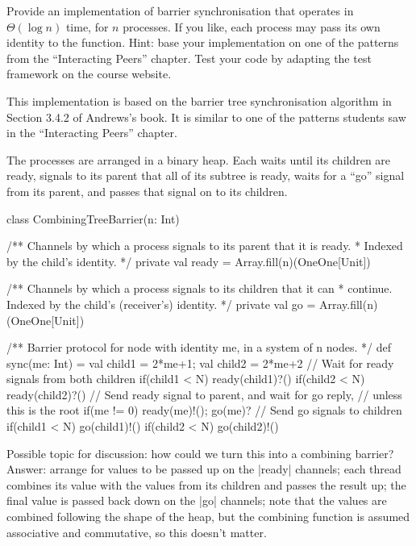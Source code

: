 \begin{question}
\label{Q:barrierLog}
Provide an implementation of barrier synchronisation that operates in
$\Theta(\log n)$ time, for $n$ processes.  If you like, each process may pass
its own identity to the  function.  Hint: base your implementation
on one of the patterns from the ``Interacting Peers'' chapter.  Test your code
by adapting the test framework on the course website. 
\end{question}


\begin{answer}
This implementation is based on the barrier tree synchronisation algorithm in
Section 3.4.2 of Andrews's book.  It is similar to one of the patterns
students saw in the ``Interacting Peers'' chapter.

The processes are arranged in a binary heap.  Each waits until its children
are ready, signals to its parent that all of its subtree is ready, waits for a
``go'' signal from its parent, and passes that signal on to its children.
%
\begin{scala}
class CombiningTreeBarrier(n: Int){
  /** Channels by which a process signals to its parent that it is ready.
    * Indexed by the child's identity. */ 
  private val ready = Array.fill(n)(OneOne[Unit])

  /** Channels by which a process signals to its children that it can
    * continue.  Indexed by the child's (receiver's) identity. */ 
  private val go = Array.fill(n)(OneOne[Unit])

  /** Barrier protocol for node with identity me, in a system of n nodes. */
  def sync(me: Int) = {
    val child1 = 2*me+1; val child2 = 2*me+2
    // Wait for ready signals from both children
    if(child1 < N) ready(child1)?()
    if(child2 < N) ready(child2)?()
    // Send ready signal to parent, and wait for go reply, 
    // unless this is the root
    if(me != 0){ ready(me)!(); go(me)? }
    // Send go signals to children
    if(child1 < N) go(child1)!()
    if(child2 < N) go(child2)!()
  }
}
\end{scala}

Possible topic for discussion: how could we turn this into a combining
barrier?  Answer: arrange for values to be passed up on the |ready| channels;
each thread combines its value with the values from its children and passes
the result up; the final value is passed back down on the |go| channels; note
that the values are combined following the shape of the heap, but the
combining function is assumed associative and commutative, so this doesn't
matter.
\end{answer}
